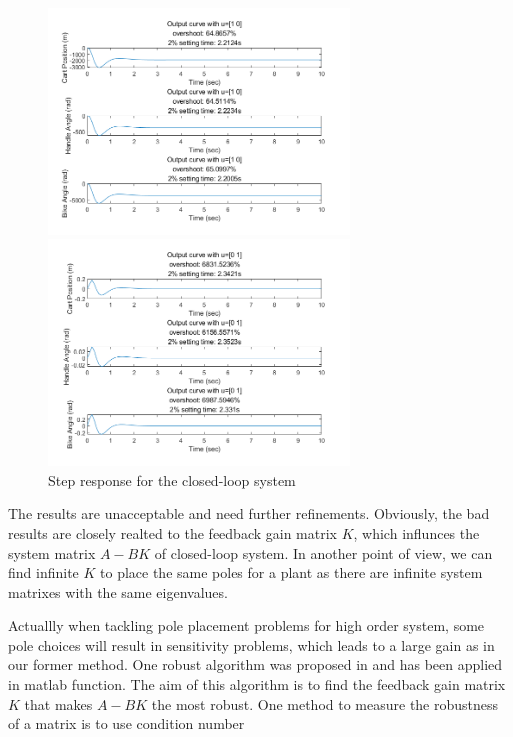 \documentclass[hyperref]{article}
\theoremstyle{nonumberplain}
\begin{document}
	\begin{figure}[htbp]
		\centering
		\begin{minipage}[t]{0.48\textwidth}
			\centering
			\includegraphics[width=8cm]{fig3.png}
		\end{minipage}
		\begin{minipage}[t]{0.48\textwidth}
			\centering
			\includegraphics[width=8cm]{fig4.png}
		\end{minipage}
	\caption{Step response for the closed-loop system}
	\label{fig3}
	\end{figure}
	
	The results are unacceptable and need further refinements. Obviously, the bad results are closely realted to the feedback gain matrix $K$, which influnces the system matrix $A-BK$ of closed-loop system. In another point of view, we can find infinite $K$ to place the same poles for a plant as there are infinite system matrixes with the same eigenvalues. 
	
	Actuallly when tackling pole placement problems for high order system, some pole choices will result in sensitivity problems, which leads to a large gain as in our former method. One robust algorithm was proposed in \cite{kautsky1985robust} and has been applied in matlab function. The aim of this algorithm is to find the feedback gain matrix $K$ that makes $A-BK$ the most robust. One method to measure the robustness of a matrix is to use condition number
	
\end{document}

